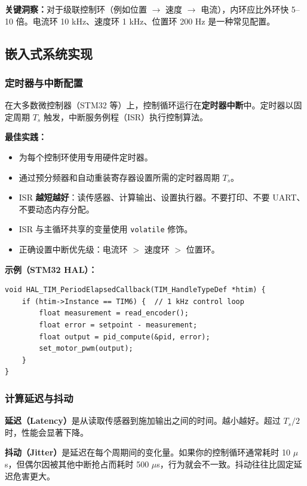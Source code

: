 \textbf{关键洞察：}对于级联控制环（例如位置 $\to$ 速度 $\to$ 电流），内环应比外环快 5--10 倍。电流环 10 kHz、速度环 1 kHz、位置环 200 Hz 是一种常见配置。

\subsection{嵌入式系统实现}

\subsubsection{定时器与中断配置}

在大多数微控制器（STM32 等）上，控制循环运行在\textbf{定时器中断}中。定时器以固定周期 $T_s$ 触发，中断服务例程（ISR）执行控制算法。

\textbf{最佳实践：}
\begin{itemize}
    \item 为每个控制环使用专用硬件定时器。
    \item 通过预分频器和自动重装寄存器设置所需的定时器周期 $T_s$。
    \item ISR \textbf{越短越好}：读传感器、计算输出、设置执行器。不要打印、不要 UART、不要动态内存分配。
    \item ISR 与主循环共享的变量使用 \texttt{volatile} 修饰。
    \item 正确设置中断优先级：电流环 $>$ 速度环 $>$ 位置环。
\end{itemize}

\textbf{示例（STM32 HAL）：}
\begin{verbatim}
void HAL_TIM_PeriodElapsedCallback(TIM_HandleTypeDef *htim) {
    if (htim->Instance == TIM6) {  // 1 kHz control loop
        float measurement = read_encoder();
        float error = setpoint - measurement;
        float output = pid_compute(&pid, error);
        set_motor_pwm(output);
    }
}
\end{verbatim}

\subsubsection{计算延迟与抖动}

\textbf{延迟（Latency）}是从读取传感器到施加输出之间的时间。越小越好。超过 $T_s / 2$ 时，性能会显著下降。

\textbf{抖动（Jitter）}是延迟在每个周期间的变化量。如果你的控制循环通常耗时 10 $\mu$s，但偶尔因被其他中断抢占而耗时 500 $\mu$s，行为就会不一致。抖动往往比固定延迟危害更大。

